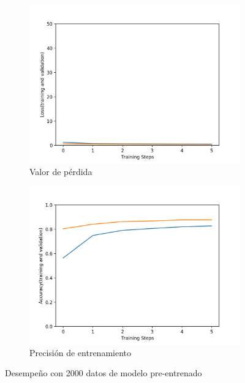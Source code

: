 \documentclass[transmag]{IEEEtran}
\begin{document}
\begin{figure}[H]
	\begin{subfigure}{0.5\textwidth}
		\centering
		\includegraphics[width=0.8\linewidth]{loss2000}
		\caption{Valor de pérdida}
	\end{subfigure}
	\begin{subfigure}{0.5\textwidth}
		\centering
		\includegraphics[width=0.8\linewidth]{acc2000}
		\caption{Precisión de entrenamiento}
	\end{subfigure}
	\caption{Desempeño con 2000 datos de modelo pre-entrenado}
	\label{fig:cnn1}
\end{figure}
\end{document}
